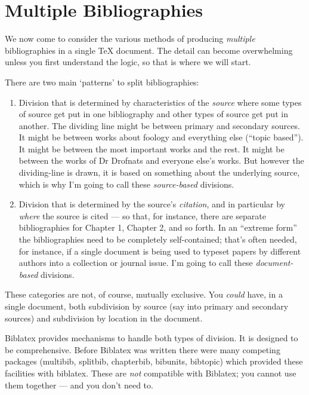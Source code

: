 \chapter{Multiple Bibliographies}\label{ch:subdivisions}


We now come to consider the various methods of producing
\emph{multiple} bibliographies in a single TeX document. The detail
can become overwhelming unless you first understand the logic, so that
is where we will start.

There are two main `patterns' to split bibliographies:

\begin{enumerate}
\item Division that is determined by characteristics of the
  \emph{source} where some types of source get put in one bibliography
  and other types of source get put in another. The dividing line
  might be between primary and secondary sources. It might be between
  works about foology and everything else (``topic based''). It might
  be between the most important works and the rest. It might be
  between the works of Dr Drofnats and everyone else's works. But
  however the dividing-line is drawn, it is based on something about
  the underlying source, which is why I'm going to call these
  \emph{source-based} divisions.
\item Division that is determined by the source's \emph{citation}, and
  in particular by \emph{where} the source is cited --- so that, for
  instance, there are separate bibliographies for Chapter 1, Chapter
  2, and so forth. In an ``extreme form'' the bibliographies need to
  be completely self-contained; that's often needed, for instance, if
  a single document is being used to typeset papers by different
  authors into a collection or journal issue. I'm going to call these
  \emph{document-based} divisions.
\end{enumerate}
These categories are not, of course, mutually exclusive. You
\emph{could} have, in a single document, both subdivision by source
(say into primary and secondary sources) and subdivision by location
in the document.

Biblatex provides mechanisms to handle both types of division. It is
designed to be comprehensive. Before Biblatex was written there were
many competing packages (multibib, splitbib, chapterbib, bibunits,
bibtopic) which provided these facilities with biblatex. These are
\emph{not} compatible with Biblatex; you cannot use them together ---
and you don't need to.


